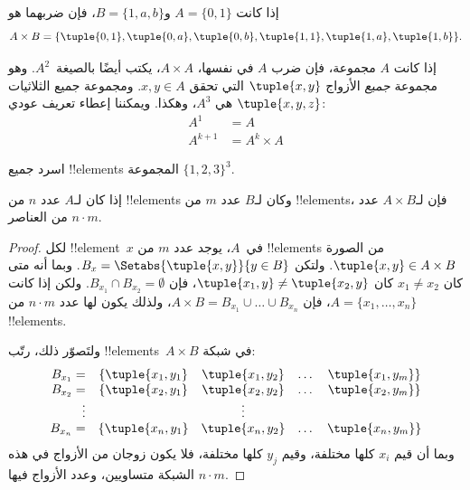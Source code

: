 \documentclass[../../../include/open-logic-section]{subfiles}
\begin{document}
\begin{ex}
إذا كانت $A = \{0, 1\}$ و$B = \{1, a, b\}$، فإن ضربهما هو
\[
A \times B = \{ \tuple{0, 1}, \tuple{0, a}, \tuple{0, b},
    \tuple{1, 1}, \tuple{1, a}, \tuple{1, b} \}.
\]
\end{ex}

\begin{ex}
إذا كانت $A$ مجموعة، فإن ضرب $A$ في نفسها، $A \times A$، يكتب أيضًا
بالصيغة~$A^2$. وهو مجموعة \emph{جميع} الأزواج $\tuple{x, y}$ التي
تحقق $x, y \in A$. ومجموعة جميع الثلاثيات $\tuple{x, y, z}$ هي
$A^3$، وهكذا. ويمكننا إعطاء تعريف عودي:
\begin{align*}
  A^1 & = A\\
  A^{k+1} & = A^k \times A
\end{align*}
\end{ex}

\begin{prob}
اسرد جميع !!{element}s المجموعة $\{1, 2, 3\}^3$.
\end{prob}

\begin{prop}
إذا كان لـ$A$ عدد $n$ من !!{element}s وكان لـ$B$ عدد $m$ من
!!{element}s، فإن لـ$A \times B$ عدد $n\cdot m$ من العناصر.
\end{prop}

\begin{proof}
لكل !!{element}~$x$ في~$A$، يوجد عدد $m$ من !!{element}s من الصورة
$\tuple{x, y} \in A \times B$. ولتكن
$B_x = \Setabs{\tuple{x, y}}{y \in B}$. وبما أنه متى كان
$x_1 \neq x_2$ كان $\tuple{x_1, y} \neq \tuple{x_2, y}$، فإن
$B_{x_1} \cap B_{x_2} = \emptyset$. ولكن إذا كانت
$A = \{x_1, \dots, x_n\}$، فإن
$A \times B = B_{x_1} \cup \dots \cup B_{x_n}$، ولذلك يكون لها عدد
$n\cdot m$ من !!{element}s.

ولتَصوّر ذلك، رتّب !!{element}s~$A \times B$ في شبكة:
\[
\begin{array}{rcccc}
  B_{x_1} = & \{\tuple{x_1, y_1} & \tuple{x_1, y_2} & \dots & \tuple{x_1, y_m}\}\\
  B_{x_2} = & \{\tuple{x_2, y_1} & \tuple{x_2, y_2} & \dots & \tuple{x_2, y_m}\}\\
  \vdots & & \vdots\\
  B_{x_n} = & \{\tuple{x_n, y_1} & \tuple{x_n, y_2} & \dots & \tuple{x_n, y_m}\}
\end{array}
\]
وبما أن قيم $x_i$ كلها مختلفة، وقيم $y_j$ كلها مختلفة، فلا يكون
زوجان من الأزواج في هذه الشبكة متساويين، وعدد الأزواج فيها $n\cdot m$.
\end{proof}
\end{document}
